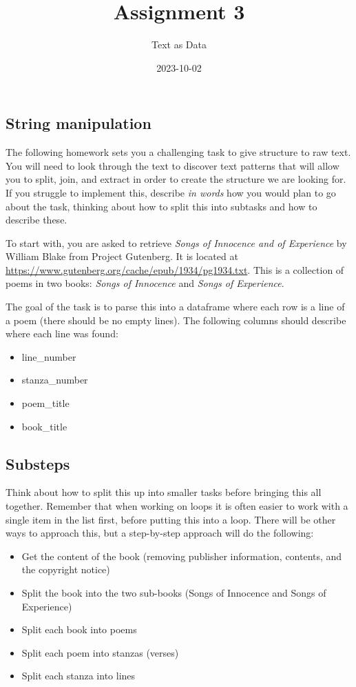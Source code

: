 \documentclass[
]{article}
\title{Assignment 3}
\author{Text as Data}
\date{2023-10-02}
\providecommand{\tightlist}{%
  \setlength{\itemsep}{0pt}\setlength{\parskip}{0pt}}
\begin{document}
\maketitle

\hypertarget{string-manipulation}{%
\subsection{String manipulation}\label{string-manipulation}}

The following homework sets you a challenging task to give structure to
raw text. You will need to look through the text to discover text
patterns that will allow you to split, join, and extract in order to
create the structure we are looking for. If you struggle to implement
this, describe \emph{in words} how you would plan to go about the task,
thinking about how to split this into subtasks and how to describe
these.

To start with, you are asked to retrieve \emph{Songs of Innocence and of
Experience} by William Blake from Project Gutenberg. It is located at
\url{https://www.gutenberg.org/cache/epub/1934/pg1934.txt}. This is a
collection of poems in two books: \emph{Songs of Innocence} and
\emph{Songs of Experience}.

The goal of the task is to parse this into a dataframe where each row is
a line of a poem (there should be no empty lines). The following columns
should describe where each line was found:

\begin{itemize}
\tightlist
\item
  line\_number
\item
  stanza\_number
\item
  poem\_title
\item
  book\_title
\end{itemize}

\hypertarget{substeps}{%
\subsection{Substeps}\label{substeps}}

Think about how to split this up into smaller tasks before bringing this
all together. Remember that when working on loops it is often easier to
work with a single item in the list first, before putting this into a
loop. There will be other ways to approach this, but a step-by-step
approach will do the following:

\begin{itemize}
\tightlist
\item
  Get the content of the book (removing publisher information, contents,
  and the copyright notice)
\item
  Split the book into the two sub-books (Songs of Innocence and Songs of
  Experience)
\item
  Split each book into poems
\item
  Split each poem into stanzas (verses)
\item
  Split each stanza into lines
\end{itemize}

  
\end{document}
